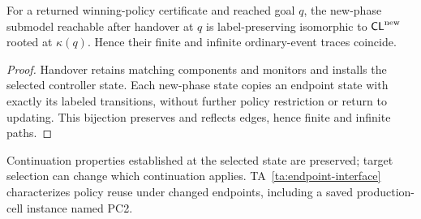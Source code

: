 \begin{proposition}
\label{prop:endpoint-continuation}
For a returned winning-policy certificate and reached goal $q$, the new-phase submodel reachable after handover at $q$ is label-preserving isomorphic to $\mathsf{CL}^{\mathrm{new}}$ rooted at $\kappa(q)$. Hence their finite and infinite ordinary-event traces coincide.
\end{proposition}
\begin{proof}
Handover retains matching components and monitors and installs the selected controller state. Each new-phase state copies an endpoint state with exactly its labeled transitions, without further policy restriction or return to updating. This bijection preserves and reflects edges, hence finite and infinite paths.
\end{proof}
Continuation properties established at the selected state are preserved; target selection can change which continuation applies. TA~\ref{ta:endpoint-interface} characterizes policy reuse under changed endpoints, including a saved production-cell instance named PC2.
